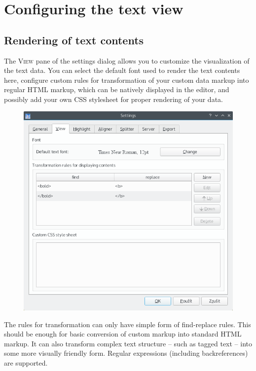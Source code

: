 \documentclass[a4paper,10pt,oneside]{book}
\newcommand{\menu}[1]{\textsc{#1}}
\begin{document}
\section{Configuring the text view}\label{ch:detail:config:editor}

\subsection{Rendering of text contents}

The \menu{View} pane of the settings dialog allows you to customize the visualization of the text data. You can select the default font used to render the text contents here, configure custom rules for transformation of your custom data markup into regular HTML markup, which can be natively displayed in the editor, and possibly add your own CSS stylesheet for proper rendering of your data.

\begin{figure}[htbf]
 \includegraphics[width=\textwidth]{screenshots/settings_view.png}
\end{figure}

The rules for transformation can only have simple form of find-replace rules. This should be enough for basic conversion of custom markup into standard HTML markup. It can also transform complex text structure -- such as tagged text -- into some more visually friendly form. Regular expressions (including backreferences) are supported.
\end{document}
